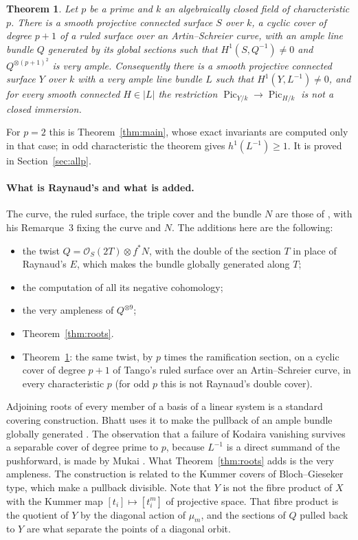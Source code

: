 \documentclass[11pt,a4paper]{article}
\theoremstyle{plain}
\newtheorem{theorem}{Theorem}
\theoremstyle{remark}
\newcommand{\OO}{\mathcal O}
\newcommand{\Pic}{\operatorname{Pic}}
\begin{document}
\begin{theorem}\label{thm:allp}
Let $p$ be a prime and $k$ an algebraically closed field of characteristic $p$. There is a smooth projective connected
surface $S$ over $k$, a cyclic cover of degree $p+1$ of a ruled surface over an Artin--Schreier curve, with an ample
line bundle $Q$ generated by its global sections such that $H^1(S,Q^{-1})\ne0$ and $Q^{\otimes(p+1)^2}$ is very ample.
Consequently there is a smooth projective connected surface $Y$ over $k$ with a very ample line bundle $L$ such that
$H^1(Y,L^{-1})\ne0$, and for every smooth connected $H\in|L|$ the restriction $\Pic_{Y/k}\to\Pic_{H/k}$ is not a closed
immersion.
\end{theorem}

For $p=2$ this is Theorem~\ref{thm:main}, whose exact invariants are computed only in that case; in odd characteristic
the theorem gives $h^1(L^{-1})\geq1$. It is proved in Section~\ref{sec:allp}.

\paragraph{What is Raynaud's and what is added.} The curve, the ruled surface, the triple cover and the bundle $N$ are
those of \cite[\S\S1--3]{Raynaud}, with his Remarque~3 fixing the curve and $N$. The additions here are the following:
\begin{itemize}
\item the twist $Q=\OO_S(2T)\otimes f^*N$, with the double of the section $T$ in place of Raynaud's $E$, which makes the
bundle globally generated along $T$;
\item the computation of all its negative cohomology;
\item the very ampleness of $Q^{\otimes 9}$;
\item Theorem~\ref{thm:roots}.
\item Theorem~\ref{thm:allp}: the same twist, by $p$ times the ramification section, on a cyclic cover of
degree $p+1$ of Tango's ruled surface over an Artin--Schreier curve, in every characteristic $p$ (for odd $p$ this is
not Raynaud's double cover).
\end{itemize}
Adjoining roots of every member of a basis of a linear system is a standard covering construction. Bhatt uses it to
make the pullback of an ample bundle globally generated \cite[proof of Proposition~7.2, p.~1771]{Bhatt}. The observation
that a failure of Kodaira vanishing survives a separable cover of degree prime to $p$, because $L^{-1}$ is a direct
summand of the pushforward, is made by Mukai \cite[p.~2]{Mukai}. What Theorem~\ref{thm:roots} adds is the very
ampleness. The construction is related to the Kummer covers of Bloch--Gieseker type, which make a pullback divisible.
Note that $Y$ is not the fibre product of $X$ with the Kummer map $[t_i]\mapsto[t_i^m]$ of projective space. That fibre
product is the quotient of $Y$ by the diagonal action of $\mu_m$, and the sections of $Q$ pulled back to $Y$ are what
separate the points of a diagonal orbit.
\end{document}
